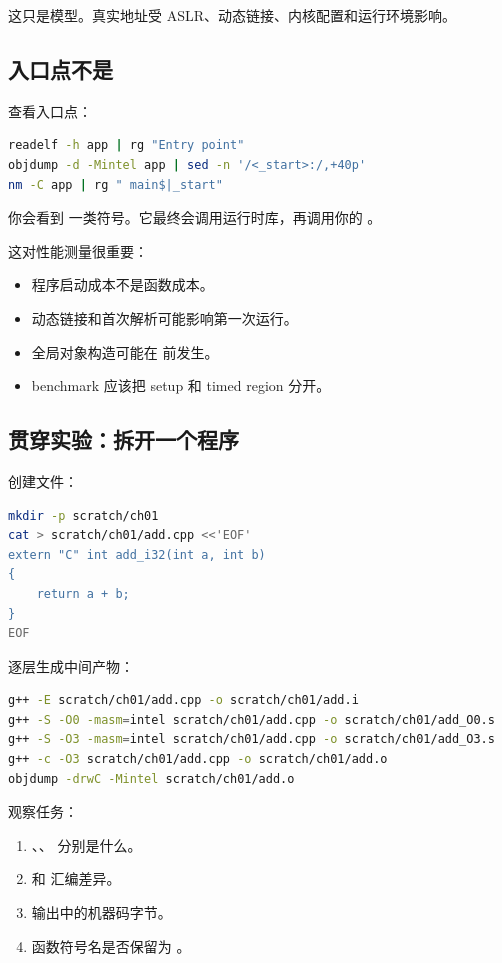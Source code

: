 这只是模型。真实地址受 ASLR、动态链接、内核配置和运行环境影响。

\subsection{入口点不是 }

查看入口点：

\begin{lstlisting}[language=bash]
readelf -h app | rg "Entry point"
objdump -d -Mintel app | sed -n '/<_start>:/,+40p'
nm -C app | rg " main$|_start"
\end{lstlisting}

你会看到  一类符号。它最终会调用运行时库，再调用你的 。

这对性能测量很重要：

\begin{itemize}
  \item 程序启动成本不是函数成本。
  \item 动态链接和首次解析可能影响第一次运行。
  \item 全局对象构造可能在  前发生。
  \item benchmark 应该把 setup 和 timed region 分开。
\end{itemize}

\subsection{贯穿实验：拆开一个程序}

\begin{labbox}
创建文件：

\begin{lstlisting}[language=bash]
mkdir -p scratch/ch01
cat > scratch/ch01/add.cpp <<'EOF'
extern "C" int add_i32(int a, int b)
{
    return a + b;
}
EOF
\end{lstlisting}

逐层生成中间产物：

\begin{lstlisting}[language=bash]
g++ -E scratch/ch01/add.cpp -o scratch/ch01/add.i
g++ -S -O0 -masm=intel scratch/ch01/add.cpp -o scratch/ch01/add_O0.s
g++ -S -O3 -masm=intel scratch/ch01/add.cpp -o scratch/ch01/add_O3.s
g++ -c -O3 scratch/ch01/add.cpp -o scratch/ch01/add.o
objdump -drwC -Mintel scratch/ch01/add.o
\end{lstlisting}

观察任务：

\begin{enumerate}
  \item {}、、 分别是什么。
  \item {} 和  汇编差异。
  \item {} 输出中的机器码字节。
  \item 函数符号名是否保留为 。
\end{enumerate}
\end{labbox}

